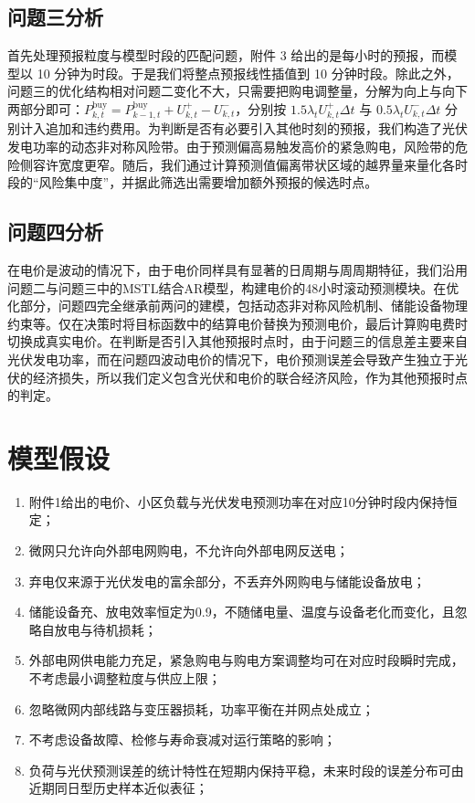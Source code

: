 \documentclass[withoutpreface,bwprint]{cumcmthesis}
\begin{document}
\subsection{问题三分析}

首先处理预报粒度与模型时段的匹配问题，附件 3 给出的是每小时的预报，而模型以 10 分钟为时段。于是我们将整点预报线性插值到 10 分钟时段。除此之外，问题三的优化结构相对问题二变化不大，只需要把购电调整量，分解为向上与向下两部分即可：$P^{\mathrm{buy}}_{k,t}=P^{\mathrm{buy}}_{k-1,t}+U^{+}_{k,t}-U^{-}_{k,t}$，分别按 $1.5\lambda_t U^{+}_{k,t}\Delta t$ 与 $0.5\lambda_t U^{-}_{k,t}\Delta t$ 分别计入追加和违约费用。为判断是否有必要引入其他时刻的预报，我们构造了光伏发电功率的动态非对称风险带。由于预测偏高易触发高价的紧急购电，风险带的危险侧容许宽度更窄。随后，我们通过计算预测值偏离带状区域的越界量来量化各时段的“风险集中度”，并据此筛选出需要增加额外预报的候选时点。


\subsection{问题四分析}

在电价是波动的情况下，由于电价同样具有显著的日周期与周周期特征，我们沿用问题二与问题三中的MSTL结合AR模型，构建电价的48小时滚动预测模块。在优化部分，问题四完全继承前两问的建模，包括动态非对称风险机制、储能设备物理约束等。仅在决策时将目标函数中的结算电价替换为预测电价，最后计算购电费时切换成真实电价。在判断是否引入其他预报时点时，由于问题三的信息差主要来自光伏发电功率，而在问题四波动电价的情况下，电价预测误差会导致产生独立于光伏的经济损失，所以我们定义包含光伏和电价的联合经济风险，作为其他预报时点的判定。


\section{模型假设}

\begin{enumerate}[label=\arabic*.]
	\item 附件1给出的电价、小区负载与光伏发电预测功率在对应10分钟时段内保持恒定；
	\item 微网只允许向外部电网购电，不允许向外部电网反送电；
	\item 弃电仅来源于光伏发电的富余部分，不丢弃外网购电与储能设备放电；
	\item 储能设备充、放电效率恒定为0.9，不随储电量、温度与设备老化而变化，且忽略自放电与待机损耗；
	\item 外部电网供电能力充足，紧急购电与购电方案调整均可在对应时段瞬时完成，不考虑最小调整粒度与供应上限；
	\item 忽略微网内部线路与变压器损耗，功率平衡在并网点处成立；
	\item 不考虑设备故障、检修与寿命衰减对运行策略的影响；
	\item 负荷与光伏预测误差的统计特性在短期内保持平稳，未来时段的误差分布可由近期同日型历史样本近似表征；
\end{enumerate}
\end{document}
